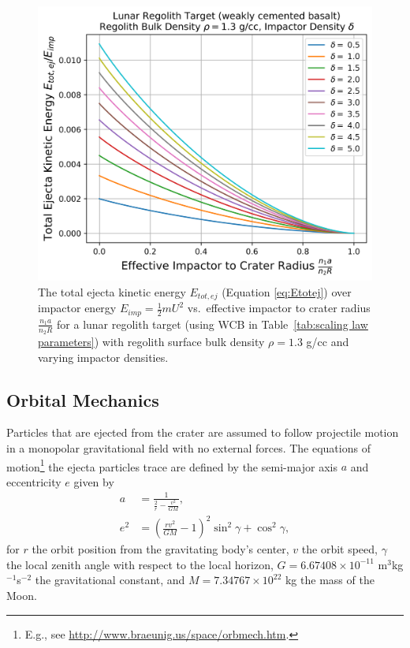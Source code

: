 \documentclass{article}
\begin{document}
\begin{figure}[!htb]
	\centering
	\includegraphics[width=0.65\linewidth]{TotalEjectaKE_vs_EffectiveCraterSize_2.png}
	\caption{The total ejecta kinetic energy $E_{tot,ej}$ (Equation \eqref{eq:Etotej}) over impactor energy $E_{imp} = \frac{1}{2}mU^2$ vs.\ effective impactor to crater radius $\frac{n_1 a}{n_2 R}$ for a lunar regolith target (using WCB in Table~\ref{tab:scaling law parameters}) with regolith surface bulk density $\rho = 1.3$ g/cc and varying impactor densities. }\label{fig:TotalEjectaKE_vs_EffectiveCraterSize_WCB}
\end{figure}

\clearpage

\subsection{Orbital Mechanics}\label{ssec:Orbital Mechanics}

Particles that are ejected from the crater are assumed to follow projectile motion in a monopolar gravitational field with no external forces. The equations of motion\footnote{E.g., see \href{http://www.braeunig.us/space/orbmech.htm}{http://www.braeunig.us/space/orbmech.htm}.} the ejecta particles trace are defined by the semi-major axis $a$ and eccentricity $e$ given by
\begin{align}
a &= \frac{1}{\frac{2}{r} - \frac{v^2}{GM}},\label{eq:a_GM}\\
e^2 &= \left(\frac{rv^2}{GM} - 1\right)^2\sin^2\gamma + \cos^2\gamma,\label{eq:e_GM}
\end{align}
for $r$ the orbit position from the gravitating body's center, $v$ the orbit speed, $\gamma$ the local zenith angle with respect to the local horizon, $G = 6.67408\times 10^{-11}$ m$^3$kg$^{-1}$s$^{-2}$ the gravitational constant, and $M = 7.34767\times 10^{22}$ kg the mass of the Moon.
\end{document}
